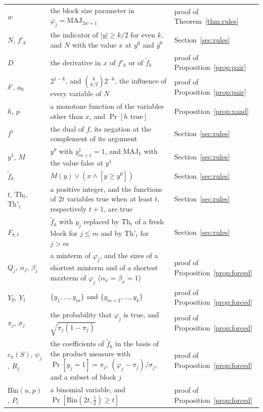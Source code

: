 \documentclass[11pt]{amsart}
\theoremstyle{remark}
\newcommand{\MAJ}{\mathrm{MAJ}}
\begin{document}
\begin{longtable}{@{}>{\raggedright\arraybackslash}p{}>{\raggedright\arraybackslash}p{}>{\raggedright\arraybackslash}p{}@{}}
$w$ & the block size parameter in $\varphi_j=\MAJ_{2w+1}$ & proof of Theorem~\ref{thm:rules} \\
$N$, $f'_k$ & the indicator of $|y|\ge k/2$ for even $k$, and $N$ with the value $x$ at $y^0$ and $\bar y^0$ & Section~\ref{sec:rules} \\
$D$ & the derivative in $x$ of $f'_k$ or of $\tilde f_k$ & proof of Proposition~\ref{prop:pair} \\
$\delta'$, $a_0$ & $2^{1-k}$, and $\binom k{k/2}2^{-k}$, the influence of every variable of $N$ & proof of Proposition~\ref{prop:pair} \\
$h$, $p$ & a monotone function of the variables other than $x$, and $\Pr[h\text{ true}]$ & Proposition~\ref{prop:xand} \\
$f^\dagger$ & the dual of $f$, its negation at the complement of its argument & Section~\ref{sec:rules} \\
$y^1$, $M$ & $y^0$ with $y^1_{m+1}=1$, and $\MAJ_k$ with the value false at $y^1$ & Section~\ref{sec:rules} \\
$\tilde f_k$ & $M(y)\vee(x\wedge[y\ge y^0])$ & Section~\ref{sec:rules} \\
$t$, $\mathrm{Th}_t$, $\mathrm{Th}'_t$ & a positive integer, and the functions of $2t$ variables true when at least $t$, respectively $t+1$, are true & Section~\ref{sec:rules} \\
$F_{k,t}$ & $\tilde f_k$ with $y_j$ replaced by $\mathrm{Th}_t$ of a fresh block for $j\le m$ and by $\mathrm{Th}'_t$ for $j>m$ & Section~\ref{sec:rules} \\
$Q_j$, $\alpha_j$, $\beta_j$ & a minterm of $\varphi_j$, and the sizes of a shortest minterm and of a shortest maxterm of $\varphi_j$ ($\alpha_x=\beta_x=1$) & proof of Proposition~\ref{prop:forced} \\
$Y_0$, $Y_1$ & $\{y_1,\dots,y_m\}$ and $\{y_{m+2},\dots,y_k\}$ & proof of Proposition~\ref{prop:forced} \\
$\pi_j$, $\sigma_j$ & the probability that $\varphi_j$ is true, and $\sqrt{\pi_j(1-\pi_j)}$ & proof of Proposition~\ref{prop:forced} \\
$c_\pi(S)$, $\psi_j$, $R_j$ & the coefficients of $\tilde f_k$ in the basis of the product measure with $\Pr[y_j=1]=\pi_j$, $(\varphi_j-\pi_j)/\sigma_j$, and a subset of block $j$ & proof of Proposition~\ref{prop:forced} \\
$\mathrm{Bin}(n,p)$, $P_t$ & a binomial variable, and $\Pr[\mathrm{Bin}(2t,\frac12)\ge t]$ & proof of Proposition~\ref{prop:forced} \\

\end{longtable}
\end{document}
